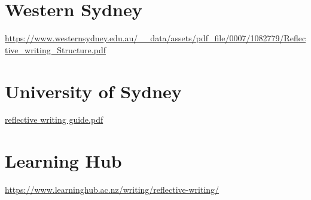 \documentclass[11pt]{article}
\begin{document}
\section{Western Sydney}
\label{sec:orgf7b243e}
\url{https://www.westernsydney.edu.au/\_\_data/assets/pdf\_file/0007/1082779/Reflective\_writing\_Structure.pdf}


\section{University of Sydney}
\label{sec:org75f0ee5}
\href{https://www.sydney.edu.au/content/dam/students/documents/learning-resources/learning-centre/writing/reflective-writing.pdf}{reflective writing guide.pdf}



\section{Learning Hub}
\label{sec:org38f51ac}
\url{https://www.learninghub.ac.nz/writing/reflective-writing/}
\end{document}
